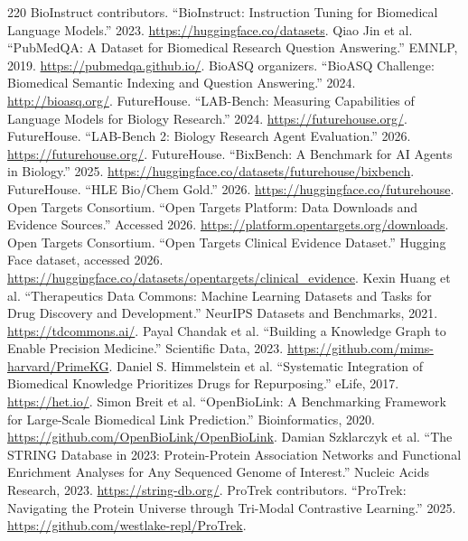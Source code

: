 \documentclass[11pt]{article}
\newcommand{\1}{\mathbf{1}}
\begin{document}
\begin{thebibliography}{220}
 BioInstruct contributors. ``BioInstruct: Instruction Tuning for Biomedical Language Models.'' 2023. \url{https://huggingface.co/datasets}.
 Qiao Jin et al. ``PubMedQA: A Dataset for Biomedical Research Question Answering.'' EMNLP, 2019. \url{https://pubmedqa.github.io/}.
 BioASQ organizers. ``BioASQ Challenge: Biomedical Semantic Indexing and Question Answering.'' 2024. \url{http://bioasq.org/}.
 FutureHouse. ``LAB-Bench: Measuring Capabilities of Language Models for Biology Research.'' 2024. \url{https://futurehouse.org/}.
 FutureHouse. ``LAB-Bench 2: Biology Research Agent Evaluation.'' 2026. \url{https://futurehouse.org/}.
 FutureHouse. ``BixBench: A Benchmark for AI Agents in Biology.'' 2025. \url{https://huggingface.co/datasets/futurehouse/bixbench}.
 FutureHouse. ``HLE Bio/Chem Gold.'' 2026. \url{https://huggingface.co/futurehouse}.
 Open Targets Consortium. ``Open Targets Platform: Data Downloads and Evidence Sources.'' Accessed 2026. \url{https://platform.opentargets.org/downloads}.
 Open Targets Consortium. ``Open Targets Clinical Evidence Dataset.'' Hugging Face dataset, accessed 2026. \url{https://huggingface.co/datasets/opentargets/clinical_evidence}.
 Kexin Huang et al. ``Therapeutics Data Commons: Machine Learning Datasets and Tasks for Drug Discovery and Development.'' NeurIPS Datasets and Benchmarks, 2021. \url{https://tdcommons.ai/}.
 Payal Chandak et al. ``Building a Knowledge Graph to Enable Precision Medicine.'' Scientific Data, 2023. \url{https://github.com/mims-harvard/PrimeKG}.
 Daniel S. Himmelstein et al. ``Systematic Integration of Biomedical Knowledge Prioritizes Drugs for Repurposing.'' eLife, 2017. \url{https://het.io/}.
 Simon Breit et al. ``OpenBioLink: A Benchmarking Framework for Large-Scale Biomedical Link Prediction.'' Bioinformatics, 2020. \url{https://github.com/OpenBioLink/OpenBioLink}.
 Damian Szklarczyk et al. ``The STRING Database in 2023: Protein-Protein Association Networks and Functional Enrichment Analyses for Any Sequenced Genome of Interest.'' Nucleic Acids Research, 2023. \url{https://string-db.org/}.
 ProTrek contributors. ``ProTrek: Navigating the Protein Universe through Tri-Modal Contrastive Learning.'' 2025. \url{https://github.com/westlake-repl/ProTrek}.

\end{thebibliography}
\end{document}
